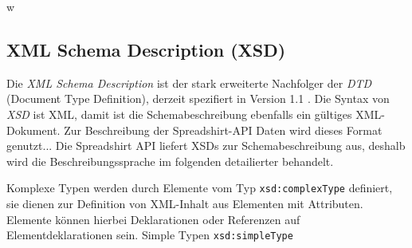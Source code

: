 w\subsection{XML Schema Description (XSD)}
\label{sec:xsd}

Die \emph{XML Schema Description} ist der stark erweiterte Nachfolger der \emph{DTD} (Document Type Definition), derzeit spezifiert in Version 1.1 \cite{XMLSchema11Specification}. 
Die Syntax von \emph{XSD} ist XML, damit ist die Schemabeschreibung ebenfalls ein gültiges XML-Dokument.
Zur Beschreibung der Spreadshirt-API Daten wird dieses Format genutzt...
Die Spreadshirt API liefert XSDs zur Schemabeschreibung aus, deshalb wird die Beschreibungssprache im folgenden detailierter behandelt.

Komplexe Typen werden durch Elemente vom Typ \texttt{xsd:complexType} definiert, sie dienen zur Definition von XML-Inhalt aus Elementen mit Attributen. Elemente können hierbei Deklarationen oder Referenzen auf Elementdeklarationen sein.
Simple Typen \texttt{xsd:simpleType} 